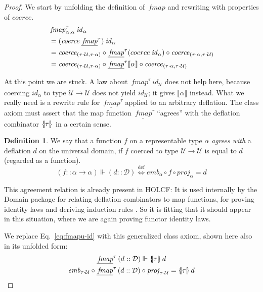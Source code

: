 \documentclass{sigplanconf}
\newcommand{\U}{\ensuremath{\mathcal{U}}}
\newcommand{\D}{\ensuremath{\mathcal{D}}}
\newcommand{\univ}[1]{\ensuremath{\underline{#1}}}
\newcommand{\REP}[1]{\ensuremath{\llbracket#1\rrbracket}}
\newcommand{\symlbrace}{\mathopen{\lbrace\mkern-4.5mu\mid}}
\newcommand{\symrbrace}{\mathclose{\mid\mkern-4.5mu\rbrace}}
\newcommand{\TC}[1]{\ensuremath{\symlbrace#1\symrbrace}}
\newcommand{\hair}{\mskip1mu}
\newcommand{\hsc}[1]{\ensuremath{\mathit{#1}}}
\newcommand{\hsid}{\hsc{id}}
\newcommand{\hsemb}{\hsc{emb}}
\newcommand{\hsprj}{\hsc{proj}}
\newcommand{\hscoerce}{\hsc{coerce}}
\newcommand{\fmap}{\,\hsc{fmap}} %
\newcommand{\fmapU}{\univ{\fmap}}
\newcommand{\tA}{\alpha}
\newcommand{\tT}{\tau}
\newcommand{\isodefl}{\Vdash}
\theoremstyle{definition}
\newtheorem{definition}{Definition}
\begin{document}
\begin{proof}
We start by unfolding the definition of $\fmap$ and rewriting with properties of $\hscoerce$.
%
\begin{align*}
& \fmap^\tT_{\tA,\tA}\:\hsid_\tA \\
&= (\hscoerce\:\fmapU^\tT)\:\hsid_\tA \\
&= \hscoerce_{(\tT\cdot\hair\U,\tT\cdot\tA)} \circ \fmapU^\tT (coerce\:\hsid_\tA) \circ \hscoerce_{(\tT\cdot\tA,\tT\cdot\hair\U)} \\
&= \hscoerce_{(\tT\cdot\hair\U,\tT\cdot\tA)} \circ \fmapU^\tT \REP{\tA} \circ \hscoerce_{(\tT\cdot\tA,\tT\cdot\hair\U)}
\end{align*}

\noindent
At this point we are stuck. A law about $\fmapU^\tT\:\hsid_\U$ does not help here, because coercing $\hsid_\tA$ to type $\U\to\U$ does not yield $\hsid_\U$; it gives $\REP{\tA}$ instead. What we really need is a rewrite rule for $\fmapU^\tT$ applied to an arbitrary deflation. The class axiom must assert that the map function $\fmapU^\tT$ ``agrees'' with the deflation combinator $\TC{\tT}$ in a certain sense.

\begin{definition}
We say that a function $f$ on a representable type $\tA$ \emph{agrees with} a deflation $d$ on the universal domain, if $f$ coerced to type $\U\to\U$ is equal to $d$ (regarded as a function).
%
\begin{equation*}
(f::\tA\to\tA) \isodefl (d::\D) \overset{\mathrm{def}}{\Longleftrightarrow} \hsc{emb}_\tA \circ f \circ \hsc{proj}_\tA = d
\end{equation*}
\end{definition}

\noindent
This agreement relation is already present in HOLCF: It is used internally by the Domain package for relating deflation combinators to map functions, for proving identity laws and deriving induction rules \cite{holcf11}. So it is fitting that it should appear in this situation, where we are again proving functor identity laws.

We replace Eq.~\eqref{eq:fmapu-id} with this generalized class axiom, shown here also in its unfolded form:
%
\begin{gather}
\fmapU^\tT\,(d::\D) \isodefl \TC{\tT}\,d \\
\hsemb_{\tT\cdot\U} \circ \fmapU^\tT\,(d::\D) \circ \hsprj_{\tT\cdot\U} = \TC{\tT}\,d
\end{gather}


\end{proof}
\end{document}
